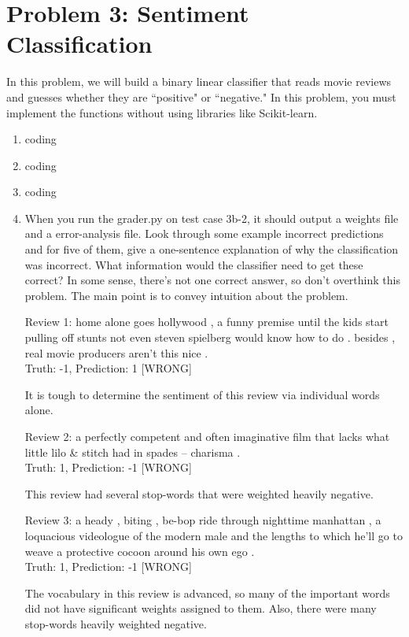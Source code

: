 \documentclass[10pt]{article}
\begin{document}
\section*{\normalsize Problem 3: Sentiment Classification}

In this problem, we will build a binary linear classifier that reads movie reviews and guesses whether they are ``positive" or ``negative." In this problem, you must implement the functions without using libraries like Scikit-learn.

\begin{enumerate}[label=(\alph*)]

  \item coding
  \item coding
  \item coding
  
  \item When you run the grader.py on test case 3b-2, it should output a weights file and a error-analysis file. Look through some example incorrect predictions and for five of them, give a one-sentence explanation of why the classification was incorrect. What information would the classifier need to get these correct? In some sense, there's not one correct answer, so don't overthink this problem. The main point is to convey intuition about the problem.

	Review 1: home alone goes hollywood , a funny premise until the kids start pulling off stunts not even steven spielberg would know how to do . besides , real movie producers aren't this nice .\\
Truth: -1, Prediction: 1 [WRONG]

	It is tough to determine the sentiment of this review via individual words alone.

	Review 2: a perfectly competent and often imaginative film that lacks what little lilo \& stitch had in spades -- charisma .\\
Truth: 1, Prediction: -1 [WRONG]

	This review had several stop-words that were weighted heavily negative.

	Review 3: a heady , biting , be-bop ride through nighttime manhattan , a loquacious videologue of the modern male and the lengths to which he'll go to weave a protective cocoon around his own ego .\\
Truth: 1, Prediction: -1 [WRONG]

	The vocabulary in this review is advanced, so many of the important words did not have significant weights assigned to them. Also, there were many stop-words heavily weighted negative.


\end{enumerate}
\end{document}
